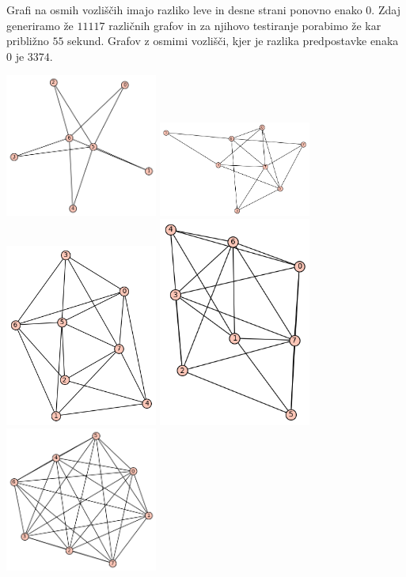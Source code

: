 \documentclass[10pt, a4paper]{article}
\begin{document}
Grafi na osmih vozliščih imajo razliko leve in desne strani ponovno enako $0$. Zdaj generiramo že $11117$ različnih grafov in za njihovo testiranje porabimo že kar približno $55$ sekund. Grafov z osmimi vozlišči, kjer je razlika predpostavke enaka $0$ je $3374$.

\includegraphics[width=5cm]{min_graf_8.1}
\includegraphics[width=5cm]{min_graf_8.2}
\includegraphics[width=5cm]{min_graf_8.3}
\includegraphics[width=5cm]{min_graf_8.4}
\includegraphics[width=5cm]{min_graf_8.5}
\end{document}
